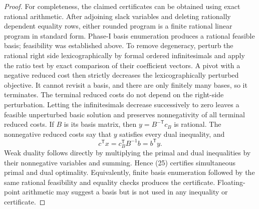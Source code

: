 \documentclass{article}
\begin{document}
\begin{proof}
For completeness, the claimed certificates can be obtained using exact
rational arithmetic.  After adjoining slack variables and deleting
rationally dependent equality rows, either rounded program is a finite
rational linear program in standard form.  Phase-I basis enumeration
produces a rational feasible basis; feasibility was established above.
To remove degeneracy, perturb the rational right side lexicographically by
formal ordered infinitesimals and apply the ratio test by exact comparison
of their coefficient vectors.  A pivot with a negative reduced cost then
strictly decreases the lexicographically perturbed objective.  It cannot
revisit a basis, and there are only finitely many bases, so it terminates.
The terminal reduced costs do not depend on the right-side perturbation.
Letting the infinitesimals decrease successively to zero leaves a feasible
unperturbed basic solution and preserves nonnegativity of all terminal
reduced costs.  If \(B\) is its basis matrix, then
\(y=B^{-\mathsf T}c_B\) is rational.  The nonnegative reduced costs say
that \(y\) satisfies every dual inequality, and
\[
 c^{\mathsf T}x=c_B^{\mathsf T}B^{-1}b=b^{\mathsf T}y.
 \tag{25}
\]
Weak duality follows directly by multiplying the primal and dual
inequalities by their nonnegative variables and summing.  Hence (25)
certifies simultaneous primal and dual optimality.  Equivalently, finite
basis enumeration followed by the same rational feasibility and equality
checks produces the certificate.  Floating-point arithmetic may suggest a
basis but is not used in any inequality or certificate.


\end{proof}
\end{document}
